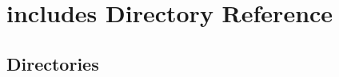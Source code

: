 \section{includes Directory Reference}
\label{dir_09e761304027c904456130627fd4dcf5}
\subsection*{Directories}
\begin{DoxyCompactItemize}
\end{DoxyCompactItemize}
